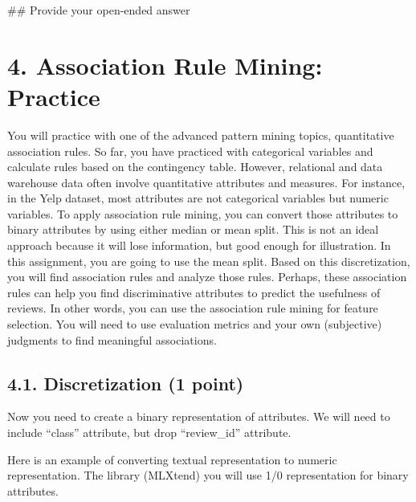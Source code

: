 \documentclass[
  letterpaper,
]{scrbook}
\newenvironment{Shaded}{\begin{snugshade}}{\end{snugshade}}
\newcommand{\CommentTok}[1]{\textcolor[rgb]{0.37,0.37,0.37}{#1}}
\begin{document}
\begin{Shaded}
\begin{Highlighting}[]
\CommentTok{\#\# Provide your open{-}ended answer}
\end{Highlighting}
\end{Shaded}

\section*{4. Association Rule Mining:
Practice}\label{association-rule-mining-practice}


You will practice with one of the advanced pattern mining topics,
quantitative association rules. So far, you have practiced with
categorical variables and calculate rules based on the contingency
table. However, relational and data warehouse data often involve
quantitative attributes and measures. For instance, in the Yelp dataset,
most attributes are not categorical variables but numeric variables. To
apply association rule mining, you can convert those attributes to
binary attributes by using either median or mean split. This is not an
ideal approach because it will lose information, but good enough for
illustration. In this assignment, you are going to use the mean split.
Based on this discretization, you will find association rules and
analyze those rules. Perhaps, these association rules can help you find
discriminative attributes to predict the usefulness of reviews. In other
words, you can use the association rule mining for feature selection.
You will need to use evaluation metrics and your own (subjective)
judgments to find meaningful associations.

\subsection*{4.1. Discretization (1
point)}\label{discretization-1-point}

Now you need to create a binary representation of attributes. We will
need to include ``class'' attribute, but drop ``review\_id'' attribute.

Here is an example of converting textual representation to numeric
representation. The library (MLXtend) you will use 1/0 representation
for binary attributes.
\end{document}
